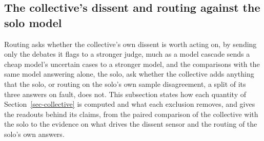 \begin{table}[t]
\centering
\small
\caption{\textbf{Capitulation under pushback, no judge.} Items are those on which both
prompts gave an at-fault first verdict. Capitulation and re-ask instability
are the shares of those first verdicts that become not at fault after the
pushback and after the neutral re-ask. The last column is NoT minus CoT in
capitulation net of re-ask instability, points, positive where NoT gives way
more, with a 95 percent interval clustered on the item. Llama's capitulation rates use the 94 of its 95 items
with a parseable verdict after the pushback. The pooled row counts model-item
pairs, and its rates average over them, 232 for capitulation (60, 94 and 78,
on 103 distinct items) and for re-ask (60, 95 and 77, on 104, grok lacking a
re-ask verdict on one item), and 231 for the net contrast (on 103), which
needs both second verdicts. Haiku failed the no-verdict guard and is not
shown.}
\label{tab-app-pushback}

\end{table}

\subsection{The collective's dissent and routing against the solo model}
\label{app-collective}

Routing asks whether the collective's own dissent is worth acting on, by
sending only the debates it flags to a stronger judge, much as a model
cascade sends a cheap model's uncertain cases to a stronger model, and the
comparisons with the same model answering alone, the solo, ask whether the
collective adds anything that the solo, or routing on the solo's own sample
disagreement, a split of its three answers on fault, does not.
This subsection states how each quantity of Section~\ref{sec-collective} is
computed and what each exclusion removes, and gives the readouts behind its
claims, from the paired comparison of the collective with the solo to the
evidence on what drives the dissent sensor and the routing of the solo's own
answers.

